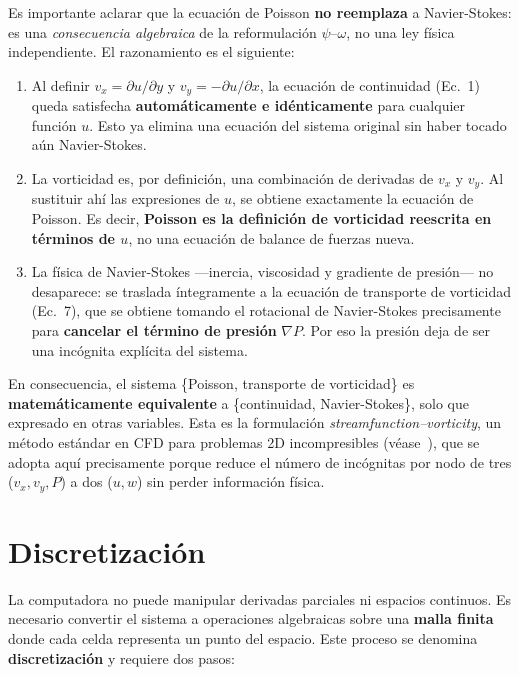 \documentclass[12pt, a4paper]{article}
\begin{document}
Es importante aclarar que la ecuación de Poisson \textbf{no reemplaza} a
Navier-Stokes: es una \emph{consecuencia algebraica} de la reformulación
$\psi$--$\omega$, no una ley física independiente. El razonamiento es el
siguiente:

\begin{enumerate}
  \item Al definir $v_x = \partial u/\partial y$ y $v_y = -\partial u/\partial x$,
        la ecuación de continuidad (Ec.~1) queda satisfecha
        \textbf{automáticamente e idénticamente} para cualquier función $u$.
        Esto ya elimina una ecuación del sistema original sin haber tocado
        aún Navier-Stokes.
  \item La vorticidad es, por definición, una combinación de derivadas de
        $v_x$ y $v_y$. Al sustituir ahí las expresiones de $u$, se obtiene
        exactamente la ecuación de Poisson. Es decir, \textbf{Poisson es la
        definición de vorticidad reescrita en términos de $u$}, no una
        ecuación de balance de fuerzas nueva.
  \item La física de Navier-Stokes —inercia, viscosidad y gradiente de
        presión— no desaparece: se traslada íntegramente a la ecuación de
        transporte de vorticidad (Ec.~7), que se obtiene tomando el
        rotacional de Navier-Stokes precisamente para \textbf{cancelar el
        término de presión} $\nabla P$. Por eso la presión deja de ser una
        incógnita explícita del sistema.
\end{enumerate}

En consecuencia, el sistema \{Poisson, transporte de vorticidad\} es
\textbf{matemáticamente equivalente} a \{continuidad, Navier-Stokes\}, solo
que expresado en otras variables. Esta es la formulación \emph{streamfunction–vorticity},
un método estándar en CFD para problemas 2D incompresibles (véase~\cite{landau}),
que se adopta aquí precisamente porque reduce el número de incógnitas por
nodo de tres ($v_x, v_y, P$) a dos ($u, w$) sin perder información física.

\section{Discretización}

La computadora no puede manipular derivadas parciales ni espacios continuos.
Es necesario convertir el sistema a operaciones algebraicas sobre una
\textbf{malla finita} donde cada celda representa un punto del espacio.
Este proceso se denomina \textbf{discretización} y requiere dos pasos:
\end{document}
